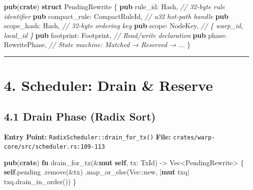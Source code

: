 \documentclass[
]{book}
\newenvironment{Shaded}{}{}
\newcommand{\BuiltInTok}[1]{\textcolor[rgb]{0.00,0.50,0.00}{#1}}
\newcommand{\CommentTok}[1]{\textcolor[rgb]{0.38,0.63,0.69}{\textit{#1}}}
\newcommand{\DataTypeTok}[1]{\textcolor[rgb]{0.56,0.13,0.00}{#1}}
\newcommand{\KeywordTok}[1]{\textcolor[rgb]{0.00,0.44,0.13}{\textbf{#1}}}
\newcommand{\NormalTok}[1]{#1}
\newcommand{\OperatorTok}[1]{\textcolor[rgb]{0.40,0.40,0.40}{#1}}
\newcommand{\PreprocessorTok}[1]{\textcolor[rgb]{0.74,0.48,0.00}{#1}}
\begin{document}
\begin{Shaded}
\begin{Highlighting}[]
\KeywordTok{pub}\NormalTok{(}\KeywordTok{crate}\NormalTok{) }\KeywordTok{struct}\NormalTok{ PendingRewrite }\OperatorTok{\{}
    \KeywordTok{pub}\NormalTok{ rule\_id}\OperatorTok{:} \BuiltInTok{Hash}\OperatorTok{,}              \CommentTok{// 32{-}byte rule identifier}
    \KeywordTok{pub}\NormalTok{ compact\_rule}\OperatorTok{:}\NormalTok{ CompactRuleId}\OperatorTok{,} \CommentTok{// u32 hot{-}path handle}
    \KeywordTok{pub}\NormalTok{ scope\_hash}\OperatorTok{:} \BuiltInTok{Hash}\OperatorTok{,}           \CommentTok{// 32{-}byte ordering key}
    \KeywordTok{pub}\NormalTok{ scope}\OperatorTok{:}\NormalTok{ NodeKey}\OperatorTok{,}             \CommentTok{// \{ warp\_id, local\_id \}}
    \KeywordTok{pub}\NormalTok{ footprint}\OperatorTok{:}\NormalTok{ Footprint}\OperatorTok{,}       \CommentTok{// Read/write declaration}
    \KeywordTok{pub}\NormalTok{ phase}\OperatorTok{:}\NormalTok{ RewritePhase}\OperatorTok{,}        \CommentTok{// State machine: Matched → Reserved → ...}
\OperatorTok{\}}
\end{Highlighting}
\end{Shaded}

\begin{center}\rule{0.5\linewidth}{0.5pt}\end{center}

\section{4. Scheduler: Drain \& Reserve}\label{scheduler-drain-reserve}

\subsection{4.1 Drain Phase (Radix Sort)}\label{drain-phase-radix-sort}

\textbf{Entry Point:} \texttt{RadixScheduler::drain\_for\_tx()}
\textbf{File:} \texttt{crates/warp-core/src/scheduler.rs:109-113}

\begin{Shaded}
\begin{Highlighting}[]
\KeywordTok{pub}\NormalTok{(}\KeywordTok{crate}\NormalTok{) }\KeywordTok{fn}\NormalTok{ drain\_for\_tx(}\OperatorTok{\&}\KeywordTok{mut} \KeywordTok{self}\OperatorTok{,}\NormalTok{ tx}\OperatorTok{:}\NormalTok{ TxId) }\OperatorTok{{-}\textgreater{}} \DataTypeTok{Vec}\OperatorTok{\textless{}}\NormalTok{PendingRewrite}\OperatorTok{\textgreater{}} \OperatorTok{\{}
    \KeywordTok{self}\OperatorTok{.}\NormalTok{pending}
        \OperatorTok{.}\NormalTok{remove(}\OperatorTok{\&}\NormalTok{tx)}
        \OperatorTok{.}\NormalTok{map\_or\_else(}\DataTypeTok{Vec}\PreprocessorTok{::}\NormalTok{new}\OperatorTok{,} \OperatorTok{|}\KeywordTok{mut}\NormalTok{ txq}\OperatorTok{|}\NormalTok{ txq}\OperatorTok{.}\NormalTok{drain\_in\_order())}
\OperatorTok{\}}
\end{Highlighting}
\end{Shaded}
\end{document}
